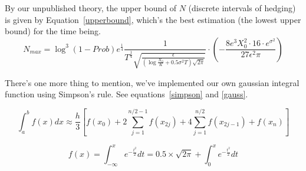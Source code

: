 \documentclass{article}
\begin{document}
By our unpublished theory, the upper bound of $N$ (discrete intervals of hedging) is given by Equation~\ref{upperbound}, which's the best estimation (the lowest upper bound) for the time being. 
\begin{equation}
\label{upperbound}
  N_{max} = \log^3{(1-Prob)e^{\frac{1}{4}}\frac{1}{T^{\frac{1}{4}}\sqrt{\frac{\epsilon}{(\log{\frac{X_0}{K}}+0.5\sigma^2T)\sqrt{2\pi}}}}}\cdot(-\frac{8e^3X_0^2\cdot 16 \cdot e^{\sigma^2}}{27\epsilon^2\pi})
\end{equation}

There's one more thing to mention, we've implemented our own gaussian integral function using Simpson's rule. See equations~\ref{simpson} and \ref{gauss}.

\begin{equation}
\label{simpson}
\int_{a}^{b}f(x)dx\approx \frac{h}{3}\left[f(x_0)+2\sum\limits_{j=1}^{n/2-1}f(x_{2j})+4\sum\limits_{j=1}^{n/2}f(x_{2j-1})+f(x_n)\right]
\end{equation}

\begin{equation}
\label{gauss}
f(x)=\int_{-\infty}^{x}e^{-\frac{t^2}{2}}dt=0.5\times \sqrt{2\pi} + \int_{0}^{x}e^{-\frac{t^2}{2}}dt
\end{equation}
\end{document}
